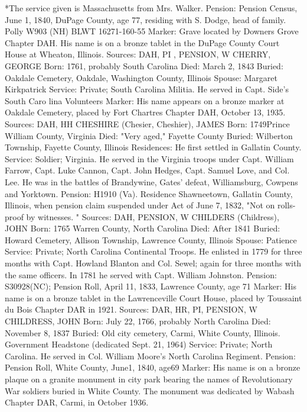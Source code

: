 *The service given is Massachusetts from Mrs. Walker. 
Pension: Pension Census, June 1, 1840, DuPage County, age 77, residing with S. Dodge, head of family. Polly W903 (NH) BLWT 16271-160-55 
Marker: Grave located by Downers Grove Chapter DAH. His name is on a bronze tablet in the DuPage County Court House at Wheaton, Illinois. 
Sources: DAH, PI , PENSION, W 
CHERRY, GEORGE 
Born: 1761, probably South Carolina 
Died: March 2, 1843 
Buried: Oakdale Cemetery, Oakdale, Washington County, Illinois 
Spouse: Margaret Kirkpatrick 
Service: Private; South Carolina Militia. He served in Capt. Side's South Caro­ lina Volunteers 
Marker: His name appears on a bronze marker at Oakdale Cemetery, placed by Fort Chartres Chapter DAH, October 13, 1935. 
Sources: DAH, HH 
CHESHIRE (Chesier, Cheshier), JAMES 
Born: 1749Prince William County, Virginia 
Died: "Very aged," Fayette County 
Buried: Wilberton Township, Fayette County, Illinois 
Residences: He first settled in Gallatin County. 
Service: Soldier; Virginia. He served in the Virginia troops under Capt. William Farrow, Capt. Luke Cannon, Capt. John Hedges, Capt. Samuel Love, and Col. Lee. He was in the battles of Brandywine, Gates' defeat, Williamsburg, Cowpens and Yorktown. 
Pension: H1910 (Va). Residence Shawneetown, Gallatin County, Illinois, when pension claim suspended under Act of June 7, 1832, "Not on rolls-proof by witnesses. " 
Sources: DAH, PENSION, W 
CHILDERS (Childress), JOHN 
Born: 1765 Warren County, North Carolina 
Died: After 1841 
Buried: Howard Cemetery, Allison Township, Lawrence County, Illinois 
Spouse: Patience 
Service: Private; North Carolina Continental Troops. He enlisted in 1779 for three months with Capt. Howland Blanton and Col. Sewel; again for three months with the same officers. In 1781 he served with Capt. William Johnston. 
Pension: S30928(NC); Pension Roll, April 11, 1833, Lawrence County, age 71 
Marker: His name is on a bronze tablet in the Lawrenceville Court House, placed by Toussaint du Bois Chapter DAR in 1921. 
Sources: DAR, HR, PI, PENSION, W 
CHILDRESS, JOHN 
Born: July 22, 1766, probably North Carolina 
Died: November 8, 1837 
Buried: Old city cemetery, Carmi, White County, Illinois. Government Headstone (dedicated Sept. 21, 1964) 
Service: Private; North Carolina. He served in Col. William Moore's North Carolina Regiment. 
Pension: Pension Roll, White County, June1, 1840, age69 
Marker: His name is on a bronze plaque on a granite monument in city park bearing the names of Revolutionary War soldiers buried in White County. The monument was dedicated by Wabash Chapter DAR, Carmi, in October 1936. 
